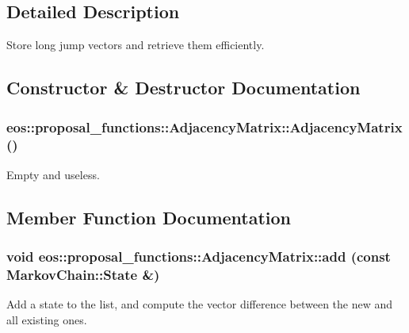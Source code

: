 \subsection{Detailed Description}
Store long jump vectors and retrieve them efficiently. 

\subsection{Constructor \& Destructor Documentation}
\hypertarget{classeos_1_1proposal__functions_1_1AdjacencyMatrix_a84ff663285192a136a291ff589b3c87e}{
\subsubsection[{AdjacencyMatrix}]{\setlength{\rightskip}{0pt plus 5cm}eos::proposal\_\-functions::AdjacencyMatrix::AdjacencyMatrix ()}}
\label{classeos_1_1proposal__functions_1_1AdjacencyMatrix_a84ff663285192a136a291ff589b3c87e}


Empty and useless. 

\subsection{Member Function Documentation}
\hypertarget{classeos_1_1proposal__functions_1_1AdjacencyMatrix_a8c5e2e2cf4791c651f2fb93b4cc70b80}{
\subsubsection[{add}]{\setlength{\rightskip}{0pt plus 5cm}void eos::proposal\_\-functions::AdjacencyMatrix::add (const {\bf MarkovChain::State} \&)}}
\label{classeos_1_1proposal__functions_1_1AdjacencyMatrix_a8c5e2e2cf4791c651f2fb93b4cc70b80}
Add a state to the list, and compute the vector difference between the new and all existing ones.

